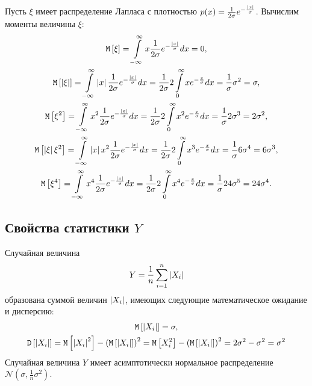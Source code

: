 Пусть $\xi$ имеет распределение Лапласа с плотностью $p(x) = \frac{1}{2 \sigma} e^{-\frac{\left | x \right |}{\sigma}}$.
Вычислим моменты величины $\xi$:
\begin{gather}
    \mathtt{M} \left [ \xi \right ] = \int \limits_{-\infty}^\infty x \frac{1}{2 \sigma} e^{-\frac{\left | x \right |}{\sigma}} dx = 0 , \\
    \mathtt{M} \left [ \left | \xi \right | \right ]
    = \int \limits_{-\infty}^\infty \left | x \right | \frac{1}{2 \sigma} e^{-\frac{\left | x \right |}{\sigma}} dx
    = \frac{1}{2 \sigma} 2 \int \limits_{0}^\infty x e^{-\frac{x}{\sigma}} dx
    = \frac{1}{\sigma} \sigma^2 = \sigma , \\
    \mathtt{M} \left [ \xi^2 \right ]
    = \int \limits_{-\infty}^\infty x^2 \frac{1}{2 \sigma} e^{-\frac{\left | x \right |}{\sigma}} dx
    = \frac{1}{2 \sigma} 2 \int \limits_{0}^\infty x^2 e^{-\frac{x}{\sigma}} dx
    = \frac{1}{\sigma} 2 \sigma^3 = 2 \sigma^2 , \\
    \mathtt{M} \left [ \left | \xi \right | \xi^2 \right ]
    = \int \limits_{-\infty}^\infty \left | x \right | x^2 \frac{1}{2 \sigma} e^{-\frac{\left | x \right |}{\sigma}} dx
    = \frac{1}{2 \sigma} 2 \int \limits_{0}^\infty x^3 e^{-\frac{x}{\sigma}} dx
    = \frac{1}{\sigma} 6 \sigma^4 = 6 \sigma^3 , \\
    \mathtt{M} \left [ \xi^4 \right ]
    = \int \limits_{-\infty}^\infty x^4 \frac{1}{2 \sigma} e^{-\frac{\left | x \right |}{\sigma}} dx
    = \frac{1}{2 \sigma} 2 \int \limits_{0}^\infty x^4 e^{-\frac{x}{\sigma}} dx
    = \frac{1}{\sigma} 24 \sigma^5 = 24 \sigma^4 .
\end{gather}

\subsection*{Свойства статистики $Y$}

Случайная величина
\begin{equation}
    Y = \frac{1}{n} \sum_{i=1}^n \left | X_i \right |
\end{equation}
образована суммой величин $\left | X_i \right |$, имеющих следующие математическое ожидание и дисперсию:
\begin{gather}
    \mathtt{M} \left [ \left | X_i \right | \right ] = \sigma, \\
    \mathtt{D} \left [ \left | X_i \right | \right ]
    = \mathtt{M} \left [ \left | X_i \right |^2 \right ] - \left ( \mathtt{M} \left [ \left | X_i \right | \right ] \right )^2
    = \mathtt{M} \left [ X_i^2 \right ] - \left ( \mathtt{M} \left [ \left | X_i \right | \right ] \right )^2
    = 2 \sigma^2 - \sigma^2 = \sigma^2
\end{gather}
Случайная величина $Y$ имеет асимптотически нормальное распределение $\mathcal{N} \left ( \sigma, \frac{1}{n} \sigma^2 \right )$.


